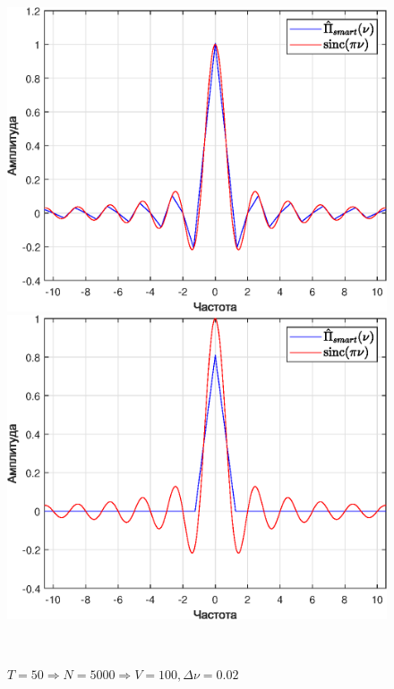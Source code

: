 \documentclass[a4paper]{article}
\begin{document}
\begin{figure}[H]
    \begin{minipage}{0.5\textwidth}
        \centering \includegraphics[width=\textwidth]{graphs/3/T_1.5_dt_0.010067_V_100_dv_0.66667/fourier_smart.eps}
        \caption{$T = 1000 \Rightarrow N = 100000 \Rightarrow V = 100, \Delta \nu = 0.01$}
    \end{minipage}\hfill
    \begin{minipage}{0.5\textwidth}
        \centering \includegraphics[width=\textwidth]{graphs/3/T_0.8_dt_0.010127_V_100_dv_1.25/fourier_smart.eps}
        \caption{$T = 50 \Rightarrow N = 5000 \Rightarrow V = 100, \Delta \nu = 0.02$}
    \end{minipage}\\[1em]
\end{figure}\noindent\
\end{document}
